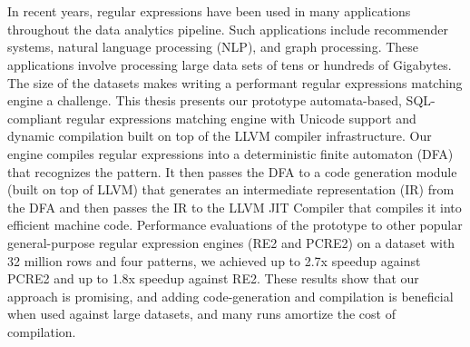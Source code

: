 \chapter{\abstractname}
In recent years, regular expressions have been used in many applications throughout the data analytics pipeline. Such applications include recommender systems, natural language processing (NLP), and graph processing. These applications involve processing large data sets of tens or hundreds of Gigabytes. The size of the datasets makes writing a performant regular expressions matching engine a challenge. This thesis presents our prototype automata-based, SQL-compliant regular expressions matching engine with Unicode support and dynamic compilation built on top of the LLVM compiler infrastructure. Our engine compiles regular expressions into a deterministic finite automaton (DFA) that recognizes the pattern. It then passes the DFA to a code generation module (built on top of LLVM) that generates an intermediate representation (IR) from the DFA and then passes the IR to the LLVM JIT Compiler that compiles it into efficient machine code. Performance evaluations of the prototype to other popular general-purpose regular expression engines (RE2 and PCRE2) on a dataset with 32 million rows and four patterns, we achieved up to 2.7x speedup against PCRE2 and up to 1.8x speedup against RE2. These results show that our approach is promising, and adding code-generation and compilation is beneficial when used against large datasets, and many runs amortize the cost of compilation.